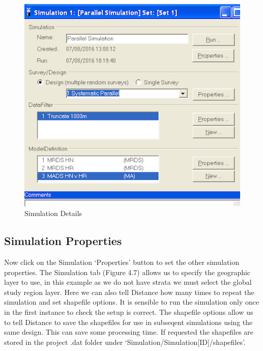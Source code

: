 \documentclass[]{book}
\theoremstyle{definition}
\theoremstyle{definition}
\theoremstyle{remark}
\begin{document}
\begin{figure}
\centering
\includegraphics{images/details.png}
\caption{Simulation Details}
\end{figure}

\subsection{Simulation Properties}\label{simulation-properties}

Now click on the Simulation `Properties' button to set the other
simulation properties. The Simulation tab (Figure 4.7) allows us to
specify the geographic layer to use, in this example as we do not have
strata we must select the global study region layer. Here we can also
tell Distance how many times to repeat the simulation and set shapefile
options. It is sensible to run the simulation only once in the first
instance to check the setup is correct. The shapefile options allow us
to tell Distance to save the shapefiles for use in subseqent simulations
using the same design. This can save some processing time. If requested
the shapefiles are stored in the project .dat folder under
`Simulation/Simulation{[}ID{]}/shapefiles'.
\end{document}

